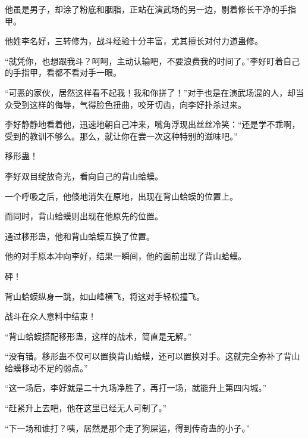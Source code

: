 \begin{this_body}
他虽是男子，却涂了粉底和胭脂，正站在演武场的另一边，剔着修长干净的手指甲。

他姓李名好，三转修为，战斗经验十分丰富，尤其擅长对付力道蛊修。

“就凭你，也想跟我斗？呵呵，主动认输吧，不要浪费我的时间了。”李好盯着自己的手指甲，看都不看对手一眼。

“可恶的家伙，居然这样看不起我！我和你拼了！”对手也是在演武场混的人，却当众受到这样的侮辱，气得脸色扭曲，咬牙切齿，向李好扑杀过来。

李好静静地看着他，迅速地朝自己冲来，嘴角浮现出丝丝冷笑：“还是学不乖啊，受到的教训不够么。那么，就让你在尝一次这种特别的滋味吧。”

移形蛊！

李好双目绽放奇光，看向自己的背山蛤蟆。

一个呼吸之后，他倏地消失在原地，出现在背山蛤蟆的位置上。

而同时，背山蛤蟆则出现在他原先的位置。

通过移形蛊，他和背山蛤蟆互换了位置。

他的对手原本冲向李好，结果一瞬间，他的面前出现了背山蛤蟆。

砰！

背山蛤蟆纵身一跳，如山峰横飞，将这对手轻松撞飞。

战斗在众人意料中结束！

“背山蛤蟆搭配移形蛊，这样的战术，简直是无解。”

“没有错。移形蛊不仅可以置换背山蛤蟆，还可以置换对手。这就完全弥补了背山蛤蟆移动不足的弱点。”

“这一场后，李好就是二十九场净胜了，再打一场，就能升上第四内城。”

“赶紧升上去吧，他在这里已经无人可制了。”

“下一场和谁打？咦，居然是那个走了狗屎运，得到传奇蛊的小子。”

\end{this_body}

